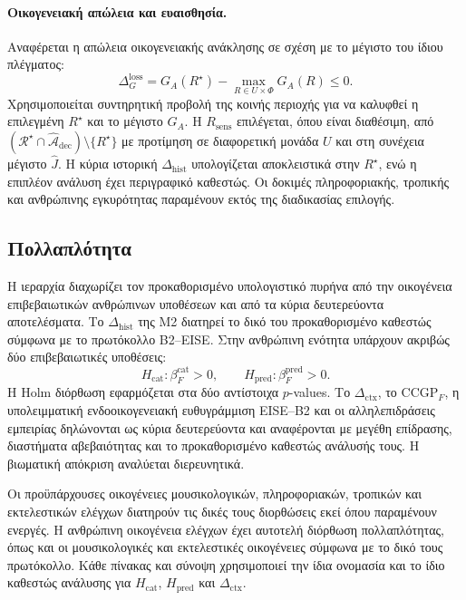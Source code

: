 \documentclass[11pt,a4paper]{article}
\begin{document}
\paragraph{Οικογενειακή απώλεια και ευαισθησία.}
Αναφέρεται η απώλεια οικογενειακής ανάκλησης σε σχέση με το μέγιστο του ίδιου πλέγματος:
\[
\Delta_G^{\mathrm{loss}}=G_A(R^\star)-\max_{R\in U\times\Phi}G_A(R)\le0.
\]
Χρησιμοποιείται συντηρητική προβολή της κοινής περιοχής για να καλυφθεί η επιλεγμένη $R^\star$ και το μέγιστο $G_A$. Η $R_{\mathrm{sens}}$ επιλέγεται, όπου είναι διαθέσιμη, από $(\mathcal R^\star\cap\widehat{\mathcal A}_{\mathrm{dec}})\setminus\{R^\star\}$ με προτίμηση σε διαφορετική μονάδα $U$ και στη συνέχεια μέγιστο $\widehat J$. Η κύρια ιστορική $\Delta_{\mathrm{hist}}$ υπολογίζεται αποκλειστικά στην $R^\star$, ενώ η επιπλέον ανάλυση έχει περιγραφικό καθεστώς. Οι δοκιμές πληροφοριακής, τροπικής και ανθρώπινης εγκυρότητας παραμένουν εκτός της διαδικασίας επιλογής.

\subsection{Πολλαπλότητα}\label{app:stats-multiplicity}

Η ιεραρχία διαχωρίζει τον προκαθορισμένο υπολογιστικό πυρήνα από την οικογένεια επιβεβαιωτικών ανθρώπινων υποθέσεων και από τα κύρια δευτερεύοντα αποτελέσματα. Το $\Delta_{\mathrm{hist}}$ της M2 διατηρεί το δικό του προκαθορισμένο καθεστώς σύμφωνα με το πρωτόκολλο B2--EISE. Στην ανθρώπινη ενότητα υπάρχουν ακριβώς δύο επιβεβαιωτικές υποθέσεις:
\[
H_{\mathrm{cat}}:\beta_F^{\mathrm{cat}}>0,
\qquad
H_{\mathrm{pred}}:\beta_F^{\mathrm{pred}}>0.
\]
Η Holm διόρθωση εφαρμόζεται στα δύο αντίστοιχα $p$-values. Το $\Delta_{\mathrm{ctx}}$, το $\mathrm{CCGP}_F$, η υπολειμματική ενδοοικογενειακή ευθυγράμμιση EISE--B2 και οι αλληλεπιδράσεις εμπειρίας δηλώνονται ως κύρια δευτερεύοντα και αναφέρονται με μεγέθη επίδρασης, διαστήματα αβεβαιότητας και το προκαθορισμένο καθεστώς ανάλυσής τους. Η βιωματική απόκριση αναλύεται διερευνητικά.

Οι προϋπάρχουσες οικογένειες μουσικολογικών, πληροφοριακών, τροπικών και εκτελεστικών ελέγχων διατηρούν τις δικές τους διορθώσεις εκεί όπου παραμένουν ενεργές. Η ανθρώπινη οικογένεια ελέγχων έχει αυτοτελή διόρθωση πολλαπλότητας, όπως και οι μουσικολογικές και εκτελεστικές οικογένειες σύμφωνα με το δικό τους πρωτόκολλο. Κάθε πίνακας και σύνοψη χρησιμοποιεί την ίδια ονομασία και το ίδιο καθεστώς ανάλυσης για $H_{\mathrm{cat}}$, $H_{\mathrm{pred}}$ και $\Delta_{\mathrm{ctx}}$.
\end{document}
